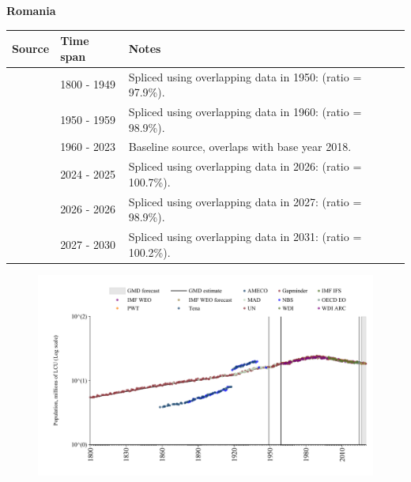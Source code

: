 \documentclass[12pt,a4paper,landscape]{article}
\begin{document}
\begin{adjustbox}{max totalsize={\paperwidth}{\paperheight},center}
\begin{minipage}[t][\textheight][t]{\textwidth}
\vspace*{0.5cm}
{}
\begin{center}
{\Large\bfseries Romania}
\end{center}
\vspace{0.5cm}
\begin{table}[H]
\centering
\small
\begin{tabular}{|l|l|l|}
\hline
\textbf{Source} & \textbf{Time span} & \textbf{Notes} \\
\hline
\rowcolor{white}\cite{Gapminder}& 1800 - 1949 &Spliced using overlapping data in 1950: (ratio = 97.9\%).\\
\rowcolor{lightgray}\cite{IMF_IFS}& 1950 - 1959 &Spliced using overlapping data in 1960: (ratio = 98.9\%).\\
\rowcolor{white}\cite{WDI}& 1960 - 2023 &Baseline source, overlaps with base year 2018.\\
\rowcolor{lightgray}\cite{OECD_EO}& 2024 - 2025 &Spliced using overlapping data in 2026: (ratio = 100.7\%).\\
\rowcolor{white}\cite{AMECO}& 2026 - 2026 &Spliced using overlapping data in 2027: (ratio = 98.9\%).\\
\rowcolor{lightgray}\cite{Gapminder}& 2027 - 2030 &Spliced using overlapping data in 2031: (ratio = 100.2\%).\\
\hline
\end{tabular}
\end{table}
\begin{figure}[H]
\centering
\includegraphics[width=\textwidth,height=0.6\textheight,keepaspectratio]{graphs/ROU_pop.pdf}
\end{figure}
\end{minipage}
\end{adjustbox}
\end{document}
